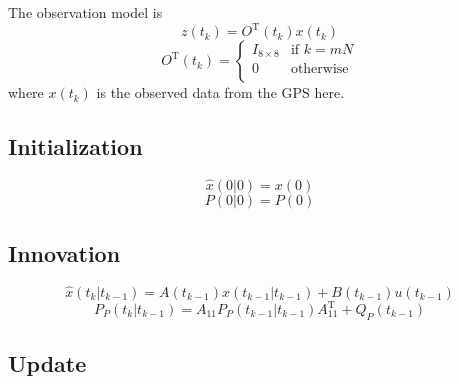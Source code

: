 \documentclass[a4paper]{report}
\numberwithin{equation}{chapter}
\begin{document}
\bigskip

The observation model is
\begin{equation}
z \left( t_k \right) = O^{\mathrm{T}} \left( t_k \right) x \left( t_k \right)
\end{equation}
\begin{equation}
O^{\mathrm{T}} \left( t_k \right) =
\begin{cases}
I_{8 \times 8} & \text{if $k = mN$}\\
0 & \text{otherwise}\\
\end{cases}
\end{equation}
where $x \left( t_k \right)$ is the observed data from the GPS here.

\subsection[Initialization]{Initialization}

\begin{equation}
\hat{x} \left( 0 | 0 \right) = x \left( 0 \right)
\end{equation}
\begin{equation}
P \left( 0 | 0 \right) = P \left( 0 \right)
\end{equation}

\subsection[Innovation]{Innovation}

\begin{equation}
\hat{x} \left( t_k | t_{k - 1} \right) = A \left( t_{k - 1} \right) \hat{x} \left( t_{k - 1} | t_{k - 1} \right) + B \left( t_{k - 1} \right) u \left( t_{k - 1} \right)
\end{equation}
\begin{equation}
P_P \left( t_k | t_{k - 1} \right) = A_{11} P_P \left( t_{k - 1} | t_{k - 1} \right) A^{\mathrm{T}}_{11} + Q_P \left( t_{k - 1} \right)
\end{equation}

\subsection[Update]{Update}
\end{document}
